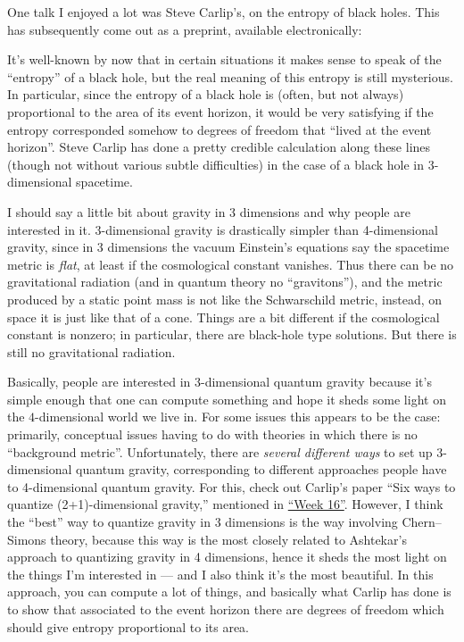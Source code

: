 \documentclass{article}
\def\tightlist{}
\renewcommand{\texttt}[1]{%
  \begingroup
  \ttfamily
  \begingroup\lccode`~=`/\lowercase{\endgroup\def~}{/\discretionary{}{}{}}%
  \begingroup\lccode`~=`[\lowercase{\endgroup\def~}{[\discretionary{}{}{}}%
  \begingroup\lccode`~=`.\lowercase{\endgroup\def~}{.\discretionary{}{}{}}%
  \catcode`/=\active\catcode`[=\active\catcode`.=\active
  \scantokens{#1\noexpand}%
  \endgroup
}
\begin{document}
One talk I enjoyed a lot was Steve Carlip's, on the entropy of black
holes. This has subsequently come out as a preprint, available
electronically:


It's well-known by now that in certain situations it makes sense to
speak of the ``entropy'' of a black hole, but the real meaning of this
entropy is still mysterious. In particular, since the entropy of a black
hole is (often, but not always) proportional to the area of its event
horizon, it would be very satisfying if the entropy corresponded somehow
to degrees of freedom that ``lived at the event horizon''. Steve Carlip
has done a pretty credible calculation along these lines (though not
without various subtle difficulties) in the case of a black hole in
3-dimensional spacetime.

I should say a little bit about gravity in 3 dimensions and why people
are interested in it. \(3\)-dimensional gravity is drastically simpler
than 4-dimensional gravity, since in 3 dimensions the vacuum Einstein's
equations say the spacetime metric is \emph{flat}, at least if the
cosmological constant vanishes. Thus there can be no gravitational
radiation (and in quantum theory no ``gravitons''), and the metric
produced by a static point mass is not like the Schwarschild metric,
instead, on space it is just like that of a cone. Things are a bit
different if the cosmological constant is nonzero; in particular, there
are black-hole type solutions. But there is still no gravitational
radiation.

Basically, people are interested in \(3\)-dimensional quantum gravity
because it's simple enough that one can compute something and hope it
sheds some light on the \(4\)-dimensional world we live in. For some
issues this appears to be the case: primarily, conceptual issues having
to do with theories in which there is no ``background metric''.
Unfortunately, there are \emph{several different ways} to set up
\(3\)-dimensional quantum gravity, corresponding to different approaches
people have to 4-dimensional quantum gravity. For this, check out
Carlip's paper ``Six ways to quantize (2+1)-dimensional gravity,''
mentioned in \protect\hyperlink{week16}{``Week 16''}. However, I think
the ``best'' way to quantize gravity in 3 dimensions is the way
involving Chern--Simons theory, because this way is the most closely
related to Ashtekar's approach to quantizing gravity in 4 dimensions,
hence it sheds the most light on the things I'm interested in --- and I
also think it's the most beautiful. In this approach, you can compute a
lot of things, and basically what Carlip has done is to show that
associated to the event horizon there are degrees of freedom which
should give entropy proportional to its area.
\end{document}
